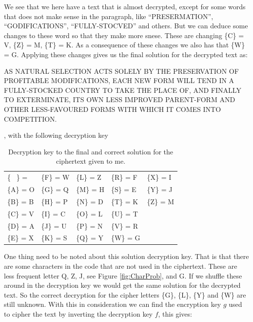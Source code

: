 \documentclass[a4paper, 11pt]{article}
\begin{document}
We see that we here have a text that is almost decrypted, except for some 
words that does not make sense in the paragraph, like ``PRESERMATION'',
``GODIFICATIONS'', ``FULLY-STOCVED'' and others. But we can deduce some changes
to these word so that they make more snese. These are changing 
\{C\} = V, \{Z\} = M, \{T\} = K. As a consequence of these changes
we also has that \{W\} = G. Applying these changes gives us the final
solution for the decrypted text as:

\begin{adjustwidth}{1.5em}{0pt}
  \small
  AS NATURAL SELECTION ACTS SOLELY BY THE PRESERVATION OF
  PROFITABLE MODIFICATIONS, EACH NEW FORM WILL TEND IN A FULLY-STOCKED 
  COUNTRY TO TAKE THE PLACE OF, AND FINALLY TO EXTERMINATE, ITS
  OWN LESS IMPROVED PARENT-FORM AND OTHER LESS-FAVOURED FORMS WITH
  WHICH IT COMES INTO COMPETITION.
\end{adjustwidth}

, with the following decryption key

\begin{table}[h]
  \centering
  \caption{Decryption key to the final and correct solution for the 
  ciphertext given to me.}
  \begin{tabular}{l l l l l}
  \{ \ \} =    &  \{F\} = W  &  \{L\} = Z  &  \{R\} = F  &  \{X\} = I  \\
  \{A\} = O  &  \{G\} = Q  &  \{M\} = H  &  \{S\} = E  &  \{Y\} = J  \\
  \{B\} = B  &  \{H\} = P  &  \{N\} = D  &  \{T\} = K  &  \{Z\} = M  \\
  \{C\} = V  &  \{I\} = C  &  \{O\} = L  &  \{U\} = T  &  \ \\
  \{D\} = A  &  \{J\} = U  &  \{P\} = N  &  \{V\} = R  &  \ \\
  \{E\} = X  &  \{K\} = S  &  \{Q\} = Y  &  \{W\} = G  &  \ \\
  \end{tabular}
  \label{tab:FinalKey}
\end{table}

One thing need to be noted about this solution decryption key. That is that 
there are some characters in the code that are not used in the ciphertext.
These are less frequent letter Q, Z, J, see Figure \ref{fig:CharProb}, and G.
If we shuffle these around in the decryption key we would get the same 
solution for the decrypted text. So the correct decryption for the cipher 
letters \{G\}, \{L\}, \{Y\} and \{W\} are still unknown. With this in 
consideration we can find the encryption key $g$ used to cipher the text by
inverting the decryption key $f$, this gives:
\end{document}
